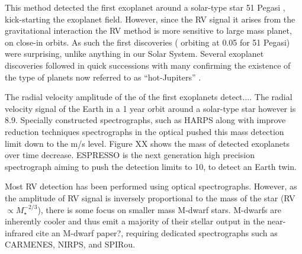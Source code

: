 This method detected the first exoplanet around a solar-type star {51 Pegasi} \citep{mayor_jupitermass_1995}, kick-starting the exoplanet field. However, since the RV signal it arises from the gravitational interaction the RV method is more sensitive to large mass planet, on close-in orbits. As such the first discoveries (\Mjup{} orbiting at 0.05\AU{} for 51 Pegasi) were surprising, unlike anything in our Solar System. Several exoplanet discoveries followed in quick successions \citep[e.g.][]{butler_planet_1996, marcy_planetary_1996} with many confirming the existence of the type of planets now referred to as ``hot-Jupiters''  \citep{butler_three_1997, charbonneau_detection_2000}.

The radial velocity amplitude of the of the first exoplanets detect.... The radial velocity signal of the Earth in a 1 year orbit around a solar-type star however is 8.9\cmps{}\citep{figueira_radial_2010}.
Specially constructed spectrographs, such as HARPS \citep{mayor_setting_2003)} along with improve reduction techniques \citet{lovis_new_2007} spectrographs in the optical pushed this mass detection limit down to the m/s level. Figure XX shows the mass of detected exoplanets over time decrease. ESPRESSO \citep{pepe_espresso_2014, megevand_espresso_2014} is the next generation high precision spectrograph aiming to push the detection limits to 10\cmps, to detect an Earth twin.

Most RV detection has been performed using optical spectrographs. However, as the amplitude of RV signal is inversely proportional to the mass of the star (RV $\propto M_{\star}^{-2/3}$), there is some focus on smaller mass M-dwarf stars. M-dwarfs are inherently cooler and thus emit a majority of their stellar output in the near-infrared {cite an M-dwarf paper?}, requiring dedicated \nir spectrographs such as {CARMENES}, {NIRPS}, and {SPIRou}.

